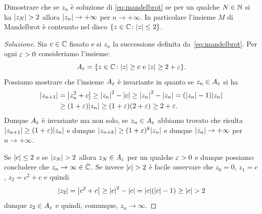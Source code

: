 \begin{exercise}
Dimostrare che se $z_n$ è soluzione di \eqref{eq:mandelbrot}
se per un qualche $N\in {\mathbb N}$ si ha ${\left|z_N\right|}> 2$ allora ${\left|z_n\right|}\to +\infty$
per $n\to +\infty$. In particolare l'insieme $M$ di Mandelbrot
è contenuto nel disco ${\left\{ z\in {\mathbb C} \colon {\left|z\right|}\le 2 \right\}}$.
\end{exercise}
%
\begin{proof}[Soluzione]
Sia $c\in {\mathbb C}$ fissato e si $z_n$ la successione definita da~\eqref{eq:mandelbrot}.
Per ogni $\varepsilon>0$ consideriamo l'insieme:
\[
  A_\varepsilon = {\left\{ z \in {\mathbb C} \colon {\left|z\right|}\ge c \text{ e } {\left|z\right|}\ge 2+\varepsilon \right\}}.
\]
Possiamo mostrare che l'insieme $A_\varepsilon$ è invariante in quanto se $z_n\in A_\varepsilon$
si ha
\begin{equation}\label{eq:473244}
\begin{aligned}
{\left|z_{n+1}\right|}
&= {\left|z_n^2+c\right|}
\ge {\left|z_n\right|}^2 - {\left|c\right|}
\ge {\left|z_n\right|}^2 - {\left|z_n\right|}
= ({\left|z_n\right|}-1){\left|z_n\right|}\\
&\ge (1+\varepsilon){\left|z_n\right|}
\ge (1+\varepsilon)(2+\varepsilon)
\ge 2+\varepsilon.
\end{aligned}
\end{equation}
Dunque $A_\varepsilon$ è invariante ma non solo, se $z_n \in A_\varepsilon$ abbiamo
trovato che risulta ${\left|z_{n+1}\right|} \ge (1+\varepsilon) {\left|z_n\right|}$
e dunque ${\left|z_{n+k}\right|} \ge (1+\varepsilon)^k {\left|z_n\right|}$ e dunque
${\left|z_n\right|}\to +\infty$ per $n\to +\infty$.

Se ${\left|c\right|}\le 2$ e se ${\left|z_N\right|}> 2$ allora $z_N \in A_\varepsilon$ per
un qualche $\varepsilon>0$ e dunque possiamo concludere che
$z_n\to \infty\in \bar {{\mathbb C}}$.
Se invece ${\left|c\right|}>2$ è facile osservare che $z_0 = 0$, $z_1=c$, $z_2=c^2+c$
e quindi
\[
  {\left|z_2\right|}
    = {\left|c^2+c\right|}
    \ge {\left|c\right|}^2 - {\left|c\right|}
    = {\left|c\right|}({\left|c\right|}-1)
    \ge {\left|c\right|} > 2
\]
dunque $z_2 \in A_\varepsilon$ e quindi, comunque, $z_n\to \infty$.

\end{proof}
